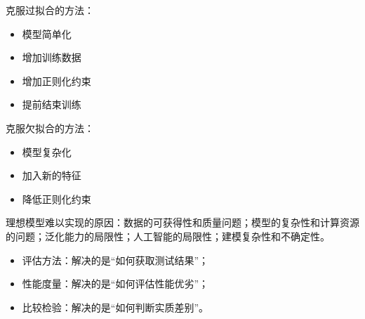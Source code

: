 克服过拟合的方法：
\begin{itemize}
    \item 模型简单化
    \item 增加训练数据
    \item 增加正则化约束
    \item 提前结束训练
\end{itemize}

克服欠拟合的方法：
\begin{itemize}
    \item 模型复杂化
    \item 加入新的特征
    \item 降低正则化约束
\end{itemize}

理想模型难以实现的原因：数据的可获得性和质量问题；模型的复杂性和计算资源的问题；泛化能力的局限性；人工智能的局限性；建模复杂性和不确定性。
\begin{itemize}
    \item 评估方法：解决的是“如何获取测试结果”；
    \item 性能度量：解决的是“如何评估性能优劣”；
    \item 比较检验：解决的是“如何判断实质差别”。
\end{itemize}
